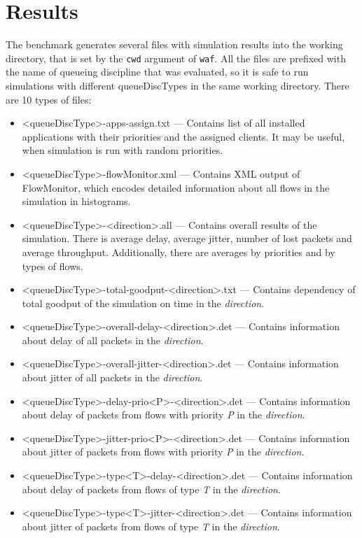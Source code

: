 \section{Results}

The benchmark generates several files with simulation results into the working directory, that is set by the \texttt{cwd} argument of \texttt{waf}. All the files are prefixed with the name of queueing discipline that was evaluated, so it is safe to run simulations with different queueDiscTypes in the same working directory. There are 10 types of files:

\begin{itemize}
	\item \textless queueDiscType\textgreater -apps-assign.txt --- Contains list of all installed applications with their priorities and the assigned clients. It may be useful, when simulation is run with random priorities. 
	\item \textless queueDiscType\textgreater -flowMonitor.xml --- Contains XML output of FlowMonitor, which encodes detailed information about all flows in the simulation in histograms.
	\item \textless queueDiscType\textgreater -\textless direction\textgreater.all --- Contains overall results of the simulation. There is average delay, average jitter, number of lost packets and average throughput. Additionally, there are averages by priorities and by types of flows.
	\item \textless queueDiscType\textgreater -total-goodput-\textless direction\textgreater.txt --- Contains dependency of total goodput of the simulation on time in the \emph{direction}.
	\item \textless queueDiscType\textgreater -overall-delay-\textless direction\textgreater.det --- Contains information about delay of all packets in the \emph{direction}.
	\item \textless queueDiscType\textgreater -overall-jitter-\textless direction\textgreater.det --- Contains information about jitter of all packets in the \emph{direction}.
	\item \textless queueDiscType\textgreater -delay-prio\textless P\textgreater -\textless direction\textgreater.det --- Contains information about delay of packets from flows with priority \emph{P} in the \emph{direction}.
	\item \textless queueDiscType\textgreater -jitter-prio\textless P\textgreater -\textless direction\textgreater.det --- Contains information about jitter of packets from flows with priority \emph{P} in the \emph{direction}.
	\item \textless queueDiscType\textgreater -type\textless T\textgreater -delay-\textless direction\textgreater.det --- Contains information about delay of packets from flows of type \emph{T} in the \emph{direction}.
	\item \textless queueDiscType\textgreater -type\textless T\textgreater -jitter-\textless direction\textgreater.det --- Contains information about jitter of packets from flows of type \emph{T} in the \emph{direction}.
\end{itemize}

